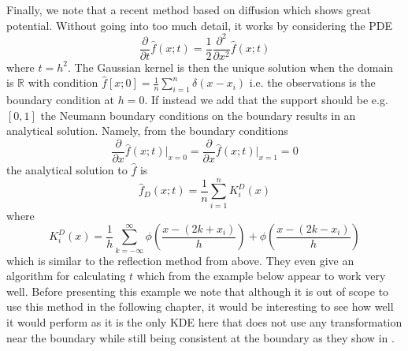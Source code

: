 \documentclass[../Thesis.tex]{subfiles}
\begin{document}
Finally, we note that a recent method based on diffusion \cite{A-Novel-Nonparametric-Density-Estimator} \cite{Kernel-density-estimation-via-diffusion} which shows great potential. Without going into too much detail, it works by considering the PDE
$$\frac{\partial}{\partial t} \hat{f}\left(x;t\right) = \frac{1}{2} \frac{\partial^2}{\partial x^2} \hat{f}\left(x;t\right)$$
where $t = h^2$. The Gaussian kernel is then the unique solution when the domain is $\mathbb{R}$ with condition $\hat{f}\left[x;0\right] = \frac{1}{n} \sum_{i=1}^{n} \delta \left(x-x_i\right)$ i.e. the observations is the boundary condition at $h=0$. If instead we add that the support should be e.g. $[0,1]$ the Neumann boundary conditions on the boundary results in an analytical solution. Namely, from the boundary conditions
$$\frac{\partial}{\partial x} \hat{f}\left(x;t\right) \bigg\rvert_{x = 0} = \frac{\partial}{\partial x} \hat{f}\left(x;t\right) \bigg\rvert_{x = 1} = 0$$
the analytical solution to $\hat{f}$ is
$$\hat{f}_D\left(x ; t\right) = \frac{1}{n} \sum_{i=1}^{n} K_i^D \left(x\right)$$
where
$$K_i^D \left(x\right) = \frac{1}{h}\sum_{k=-\infty}^{\infty} \phi\left(\frac{x - \left(2k+x_i\right)}{h}\right) + \phi\left(\frac{x - \left(2k-x_i\right)}{h}\right)$$
which is similar to the reflection method from above. They even give an algorithm for calculating $t$ which from the example below appear to work very well. Before presenting this example we note that although it is out of scope to use this method in the following chapter, it would be interesting to see how well it would perform as it is the only KDE here that does not use any transformation near the boundary while still being consistent at the boundary as they show in \cite{Kernel-density-estimation-via-diffusion}.
\end{document}
